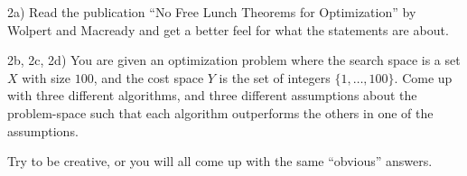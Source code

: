 2a) Read the publication ``No Free Lunch Theorems for Optimization'' by Wolpert
and Macready and get a better feel for what the statements are about.

2b, 2c, 2d) You are given an optimization problem where the search space is a
set $X$ with size $100$, and the cost space $Y$ is the set of integers $\{1,
\ldots, 100\}$.  Come up with three different algorithms, and three different
assumptions about the problem-space such that each algorithm outperforms the
others in one of the assumptions.

Try to be creative, or you will all come up with the same ``obvious'' answers.

\exerfoot
